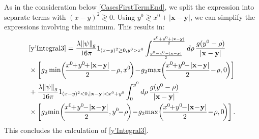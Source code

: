 \documentclass[b5paper,draft,openbib,12pt]{memoir}
\newcommand{\vx}{\mathbf{x}}
\newcommand{\vy}{\mathbf{y}}
\begin{document}
As in the consideration below 
\eqref{CasesFirstTermEnd}, we split the expression 
into separate terms with \((x-y)^2 \gtrless 0\). 
Using \(y^0\gtrless x^0+|\vx-\vy|\), we can simplify 
the expressions involving the minimum. This results 
in:
\begin{align}
    &\eqref{y'Integral3} =
    \frac{\lambda\|\psi\|_g}{16\pi} 1_{(x-y)^2\ge0,y^0>x^0}
    \int_{\frac{y^0-x^0-|\vx-\vy|}{2}}^{\frac{x^0+y^0+|\vx-\vy|}{2}}d\rho \, \frac{g(y^0-\rho)}{|\vx-\vy|}\nonumber\\
    &\times \left[g_2 \min\!\left(\!\frac{x^0\!\!+\!y^0\!\!+\!|\vx\!-\!\vy|}{2}\!-\!\rho,x^0\!\right) \!-\!g_2\!\max\!\left(\! \frac{x^0\!\!+\!y^0\!\!-\!|\vx\!-\!\vy|}{2}\!-\!\rho,0\!\right) \right]\nonumber\\
    &+\frac{\lambda\|\psi\|_g}{16\pi} 
    1_{(x-y)^2<0,|\vx-\vy|<x^0+y^0}
    \int_{0}^{y^0}d\rho \, \frac{g(y^0-\rho)}{|\vx-\vy|}\label{eq:resulty'Integral3}\\
    &\times \left[g_2\!\min\!\left(\!\frac{x^0\!\!+\!y^0\!\!-\!|\vx\!-\!\vy|}{2},y^0\!\!-\!\rho\!\right) \!-\!g_2\!\max\!\left( \!\frac{x^0\!\!+\!y^0\!\!-\!|\vx\!-\!\vy|}{2}\!-\!\rho,0\!\right) \right].\notag
\end{align}
This concludes the calculation of \eqref{y'Integral3}.
\end{document}
